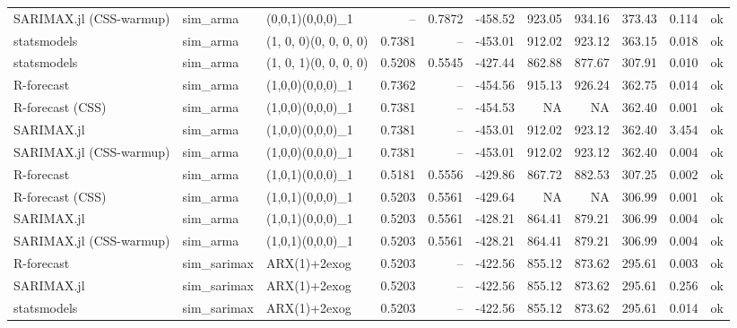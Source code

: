 \begin{table}[t]
\begin{tabular}{lllrrrrrrrl}
SARIMAX.jl (CSS-warmup) & sim\_arma & (0,0,1)(0,0,0)\_1 & -- & 0.7872 & -458.52 & 923.05 & 934.16 & 373.43 & 0.114 & ok \\
statsmodels & sim\_arma & (1, 0, 0)(0, 0, 0, 0) & 0.7381 & -- & -453.01 & 912.02 & 923.12 & 363.15 & 0.018 & ok \\
statsmodels & sim\_arma & (1, 0, 1)(0, 0, 0, 0) & 0.5208 & 0.5545 & -427.44 & 862.88 & 877.67 & 307.91 & 0.010 & ok \\
R-forecast & sim\_arma & (1,0,0)(0,0,0)\_1 & 0.7362 & -- & -454.56 & 915.13 & 926.24 & 362.75 & 0.014 & ok \\
R-forecast (CSS) & sim\_arma & (1,0,0)(0,0,0)\_1 & 0.7381 & -- & -454.53 & NA & NA & 362.40 & 0.001 & ok \\
SARIMAX.jl & sim\_arma & (1,0,0)(0,0,0)\_1 & 0.7381 & -- & -453.01 & 912.02 & 923.12 & 362.40 & 3.454 & ok \\
SARIMAX.jl (CSS-warmup) & sim\_arma & (1,0,0)(0,0,0)\_1 & 0.7381 & -- & -453.01 & 912.02 & 923.12 & 362.40 & 0.004 & ok \\
R-forecast & sim\_arma & (1,0,1)(0,0,0)\_1 & 0.5181 & 0.5556 & -429.86 & 867.72 & 882.53 & 307.25 & 0.002 & ok \\
R-forecast (CSS) & sim\_arma & (1,0,1)(0,0,0)\_1 & 0.5203 & 0.5561 & -429.64 & NA & NA & 306.99 & 0.001 & ok \\
SARIMAX.jl & sim\_arma & (1,0,1)(0,0,0)\_1 & 0.5203 & 0.5561 & -428.21 & 864.41 & 879.21 & 306.99 & 0.004 & ok \\
SARIMAX.jl (CSS-warmup) & sim\_arma & (1,0,1)(0,0,0)\_1 & 0.5203 & 0.5561 & -428.21 & 864.41 & 879.21 & 306.99 & 0.004 & ok \\
R-forecast & sim\_sarimax & ARX(1)+2exog & 0.5203 & -- & -422.56 & 855.12 & 873.62 & 295.61 & 0.003 & ok \\
SARIMAX.jl & sim\_sarimax & ARX(1)+2exog & 0.5203 & -- & -422.56 & 855.12 & 873.62 & 295.61 & 0.256 & ok \\
statsmodels & sim\_sarimax & ARX(1)+2exog & 0.5203 & -- & -422.56 & 855.12 & 873.62 & 295.61 & 0.014 & ok \\
\hline
\end{tabular}
\end{table}